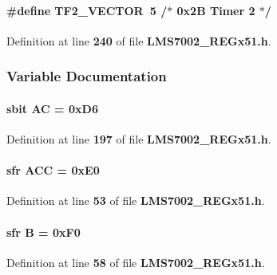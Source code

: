 \paragraph[{T\+F2\+\_\+\+V\+E\+C\+T\+OR}]{\setlength{\rightskip}{0pt plus 5cm}\#define T\+F2\+\_\+\+V\+E\+C\+T\+OR~5  /$\ast$ 0x2\+B Timer 2 $\ast$/}\label{LMS7002__REGx51_8h_a08f141c662070df0af8f2754a1929d7f}


Definition at line {\bf 240} of file {\bf L\+M\+S7002\+\_\+\+R\+E\+Gx51.\+h}.



\subsubsection{Variable Documentation}
\paragraph[{AC}]{\setlength{\rightskip}{0pt plus 5cm}sbit AC = 0x\+D6}\label{LMS7002__REGx51_8h_ace7fa7638f21bcc10a20d55dd16403d4}


Definition at line {\bf 197} of file {\bf L\+M\+S7002\+\_\+\+R\+E\+Gx51.\+h}.

\paragraph[{A\+CC}]{\setlength{\rightskip}{0pt plus 5cm}sfr A\+CC = 0x\+E0}\label{LMS7002__REGx51_8h_a0d14bf524906f7de76b7ab66ca8ed857}


Definition at line {\bf 53} of file {\bf L\+M\+S7002\+\_\+\+R\+E\+Gx51.\+h}.

\paragraph[{B}]{\setlength{\rightskip}{0pt plus 5cm}sfr B = 0x\+F0}\label{LMS7002__REGx51_8h_a5a9eaf23e07662cdbe357d4d4e415cb2}


Definition at line {\bf 58} of file {\bf L\+M\+S7002\+\_\+\+R\+E\+Gx51.\+h}.



